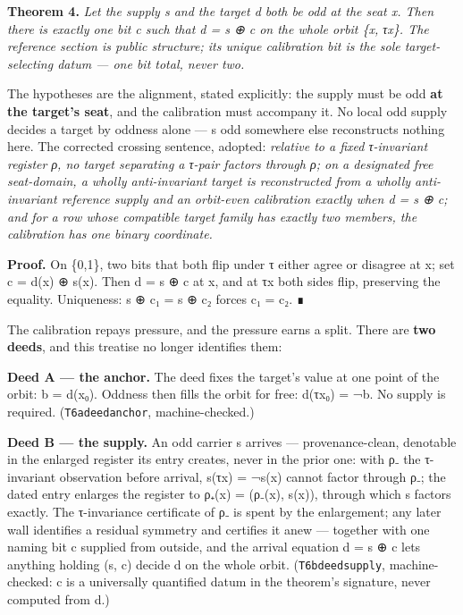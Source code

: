 \documentclass[10pt]{article}
\renewcommand{\_}{\origunderscore\allowbreak}
\begin{document}
\textbf{Theorem 4.} \emph{Let the supply s and the target d both be odd
at the seat x. Then there is exactly one bit c such that d = s ⊕ c on
the whole orbit \{x, τx\}. The reference section is public structure;
its unique calibration bit is the sole target-selecting datum --- one
bit total, never two.}

The hypotheses are the alignment, stated explicitly: the supply must be
odd \textbf{at the target's seat}, and the calibration must accompany
it. No local odd supply decides a target by oddness alone --- s odd
somewhere else reconstructs nothing here. The corrected crossing
sentence, adopted: \emph{relative to a fixed τ-invariant register ρ, no
target separating a τ-pair factors through ρ; on a designated free
seat-domain, a wholly anti-invariant target is reconstructed from a
wholly anti-invariant reference supply and an orbit-even calibration
exactly when d = s ⊕ c; and for a row whose compatible target family has
exactly two members, the calibration has one binary coordinate.}

\textbf{Proof.} On \{0,1\}, two bits that both flip under τ either agree
or disagree at x; set c = d(x) ⊕ s(x). Then d = s ⊕ c at x, and at τx
both sides flip, preserving the equality. Uniqueness: s ⊕ c₁ = s ⊕ c₂
forces c₁ = c₂. ∎

The calibration repays pressure, and the pressure earns a split. There
are \textbf{two deeds}, and this treatise no longer identifies them:

\textbf{Deed A --- the anchor.} The deed fixes the target's value at one
point of the orbit: b = d(x₀). Oddness then fills the orbit for free:
d(τx₀) = ¬b. No supply is required. (\texttt{T6a\_deed\_anchor},
machine-checked.)

\textbf{Deed B --- the supply.} An odd carrier s arrives ---
provenance-clean, denotable in the enlarged register its entry creates,
never in the prior one: with ρ₋ the τ-invariant observation before
arrival, s(τx) = ¬s(x) cannot factor through ρ₋; the dated entry
enlarges the register to ρ₊(x) = (ρ₋(x), s(x)), through which s factors
exactly. The τ-invariance certificate of ρ₋ is spent by the enlargement;
any later wall identifies a residual symmetry and certifies it anew ---
together with one naming bit c supplied from outside, and the arrival
equation d = s ⊕ c lets anything holding (s, c) decide d on the whole
orbit. (\texttt{T6b\_deed\_supply}, machine-checked: c is a universally
quantified datum in the theorem's signature, never computed from d.)
\end{document}
